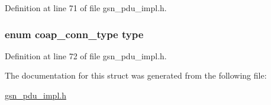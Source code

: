 Definition at line 71 of file gsn\_\-pdu\_\-impl.h.

\hypertarget{a00456_a0732b6df1426f35ef3677a29fbdb5786}{
\subsubsection[{type}]{\setlength{\rightskip}{0pt plus 5cm}enum {\bf coap\_\-conn\_\-type} {\bf type}}}
\label{a00456_a0732b6df1426f35ef3677a29fbdb5786}


Definition at line 72 of file gsn\_\-pdu\_\-impl.h.



The documentation for this struct was generated from the following file:\begin{DoxyCompactItemize}
\item 
\hyperlink{a00538}{gsn\_\-pdu\_\-impl.h}\end{DoxyCompactItemize}
